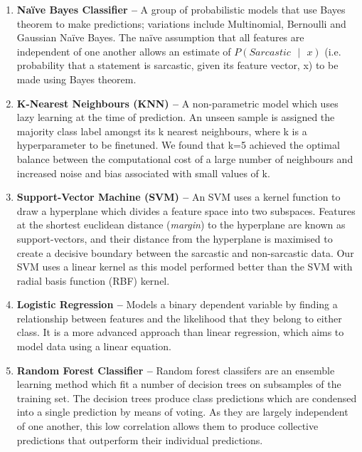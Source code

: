 \documentclass[12pt,a4paper]{article}
\begin{document}
\begin{enumerate}
	\item \textbf{Na\"{i}ve Bayes Classifier --} A group of probabilistic models that use Bayes theorem to make predictions; variations include Multinomial, Bernoulli and Gaussian Na\"{i}ve Bayes. The na\"{i}ve assumption that all features are independent of one another allows an estimate of ${P(Sarcastic \text{ }| \text{ }x)}$ (i.e. probability that a statement is sarcastic, given its feature vector, x) to be made using Bayes theorem.\vspace{-3pt}
	
	\item \textbf{K-Nearest Neighbours (KNN) --} A non-parametric model which uses lazy learning at the time of prediction. An unseen sample is assigned the majority class label amongst its k nearest neighbours, where k is a hyperparameter to be finetuned. We found that k=5 achieved the optimal balance between the computational cost of a large number of neighbours and increased noise and bias associated with small values of k.\vspace{-3pt}
	
	\item \textbf{Support-Vector Machine (SVM) --} An SVM \cite{cortes1995support} uses a kernel function to draw a hyperplane which divides a feature space into two subspaces. Features at the shortest euclidean distance (\textit{margin}) to the hyperplane are known as support-vectors, and their distance from the hyperplane is maximised to create a decisive boundary between the sarcastic and non-sarcastic data. Our SVM uses a linear kernel as this model performed better than the SVM with radial basis function (RBF) kernel.\vspace{-3pt}

	\item \textbf{Logistic Regression --} Models a binary dependent variable by finding a relationship between features and the likelihood that they belong to either class. It is a more advanced approach than linear regression, which aims to model data using a linear equation.\vspace{-3pt}

	\item \textbf{Random Forest Classifier --}
	 Random forest classifers \cite{breiman2001random} are an ensemble learning method which fit a number of decision trees on subsamples of the training set. The decision trees produce class predictions which are condensed into a single prediction by means of voting. As they are largely independent of one another, this low correlation allows them to produce collective predictions that outperform their individual predictions.
\end{enumerate}
\end{document}
